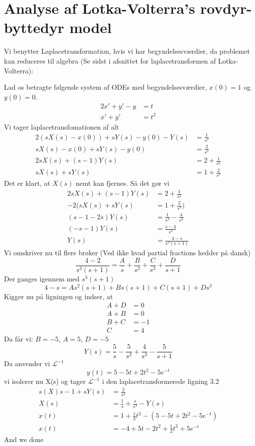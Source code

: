 \section{Analyse af Lotka-Volterra's rovdyr-byttedyr model}
Vi benytter Laplacetransformation, hvis vi har begyndelsesværdier, da problemet kan reduceres til algebra (Se sidst i afsnittet for laplacetransformen af Lotka-Volterra):
\begin{Example}
\textnormal{Lad os betragte følgende system af ODEs med begyndelsesværdier, $x(0)=1$ og $y(0)=0$.}
\begin{align}
    2x' + y' - y &= t\\
    x' + y' &= t^2
\end{align}
\textnormal{Vi tager laplacetransfomationen af alt}
\begin{align*}
    2(s X(s) - x(0)) + sY(s) - y(0) - Y(s) &= \frac{1}{s^2}\\
    s X(s) - x(0) + sY(s) - y(0) &= \frac{2}{s^3}\\
    2sX(s) + (s-1)Y(s) &= 2 + \frac{1}{s^2}\\
    sX(s) + sY(s) &= 1 + \frac{2}{s^3}
\end{align*}
\textnormal{Det er klart, at $X(s)$ nemt kan fjernes. Så det gør vi}
\begin{align*}
    2sX(s) + (s-1)Y(s) &= 2 + \frac{1}{s^2}\\
    -2(sX(s) + sY(s) &= 1 + \frac{2}{s^3})\\
    (s-1-2s)Y(s) &= \frac{1}{s^2} - \frac{4}{s^3}\\
    (-s-1)Y(s) &= \frac{s-4}{s^3}\\
    Y(s) &= \frac{4-s}{s^3(s + 1)}
\end{align*}
\textnormal{Vi omskriver nu til flere brøker (Ved ikke hvad partial fractions hedder på dansk)}
$$ \frac{4-2}{s^3(s+1)} = \frac{A}{s} + \frac{B}{s^2} + \frac{C}{s^3} + \frac{D}{s+1}$$
\textnormal{Der ganges igennem med $s^3(s+1)$}
$$ 4 - s = A s^2(s+1) + Bs(s+1) + C(s+1) + Ds^3$$
\textnormal{Kigger nu på ligningen og indser, at}
\begin{align*}
    A + D &= 0\\
    A + B &= 0\\
    B + C &= -1\\
    C &= 4
\end{align*}
\textnormal{Da får vi: $B = -5$, $A = 5$, $D = -5$}
$$Y(s) = \frac{5}{s} -\frac{5}{s^2} + \frac{4}{s^3} - \frac{5}{s+1}$$
\textnormal{Da anvender vi $\mathcal{L}^{-1}$}
$$ y(t) = 5 - 5t + 2t^2 - 5e^{-t}$$
\textnormal{vi isolerer nu X(s) og tager $\mathcal{L}^{-1}$ i den laplacetransformerede ligning 3.2}
\begin{align*}
    s(X)s - 1 + sY(s) &= \frac{2}{s^3}\\
    X(s) &= \frac{1}{s} + \frac{s}{s^4} - Y(s)\\
    x(t) &= 1 + \frac{1}{3}t^3 - (5 - 5t + 2t^2 - 5e^{-t})\\
    x(t) &= -4 + 5t-2t^2 + \frac{1}{3}t^3 + 5e^{-t}
\end{align*}
\textnormal{And we done}

\end{Example}


